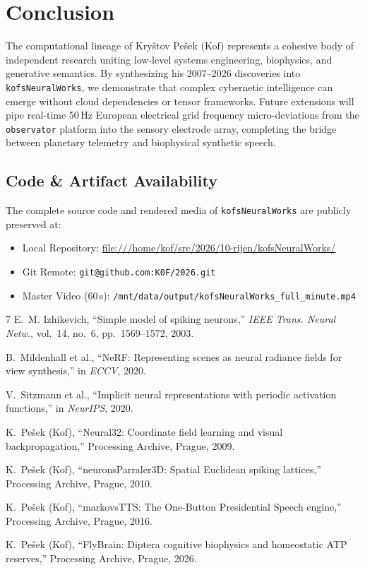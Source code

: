 \documentclass[10pt,twocolumn,a4paper]{article}
\begin{document}
\section{Conclusion}

The computational lineage of Kry\v{s}tov Pe\v{s}ek (Kof) represents a cohesive body of independent research uniting low-level systems engineering, biophysics, and generative semantics. By synthesizing his 2007--2026 discoveries into \texttt{kofsNeuralWorks}, we demonstrate that complex cybernetic intelligence can emerge without cloud dependencies or tensor frameworks. Future extensions will pipe real-time 50\,Hz European electrical grid frequency micro-deviations from the \texttt{observator} platform into the sensory electrode array, completing the bridge between planetary telemetry and biophysical synthetic speech.

\subsection*{Code \& Artifact Availability}
The complete source code and rendered media of \texttt{kofsNeuralWorks} are publicly preserved at:
\begin{itemize}\itemsep=1pt
    \item Local Repository: \url{file:///home/kof/src/2026/10-rijen/kofsNeuralWorks/}
    \item Git Remote: \texttt{git@github.com:K0F/2026.git}
    \item Master Video (60\,s): \texttt{/mnt/data/output/kofsNeuralWorks\_full\_minute.mp4}
\end{itemize}

\begin{thebibliography}{7}\itemsep=1pt
E.~M. Izhikevich, ``Simple model of spiking neurons,'' \emph{IEEE Trans. Neural Netw.}, vol.~14, no.~6, pp.~1569--1572, 2003.

B.~Mildenhall et al., ``NeRF: Representing scenes as neural radiance fields for view synthesis,'' in \emph{ECCV}, 2020.

V.~Sitzmann et al., ``Implicit neural representations with periodic activation functions,'' in \emph{NeurIPS}, 2020.

K.~Pe\v{s}ek (Kof), ``Neural32: Coordinate field learning and visual backpropagation,'' Processing Archive, Prague, 2009.

K.~Pe\v{s}ek (Kof), ``neuronsParraler3D: Spatial Euclidean spiking lattices,'' Processing Archive, Prague, 2010.

K.~Pe\v{s}ek (Kof), ``markovsTTS: The One-Button Presidential Speech engine,'' Processing Archive, Prague, 2016.

K.~Pe\v{s}ek (Kof), ``FlyBrain: Diptera cognitive biophysics and homeostatic ATP reserves,'' Processing Archive, Prague, 2026.
\end{thebibliography}
\end{document}
